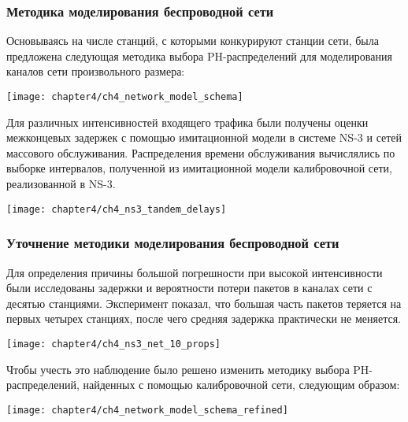 \begin{frame}
    \frametitle{Методика моделирования беспроводной сети}
    \footnotesize
    Основываясь на числе станций, с которыми конкурируют станции сети, была предложена следующая методика выбора PH-распределений для моделирования каналов сети произвольного размера:
    \begin{center}
        \texttt{[image: chapter4/ch4\_network\_model\_schema]}
    \end{center}

    \footnotesize
    Для различных интенсивностей входящего трафика были получены оценки межконцевых задержек с помощью имитационной модели в системе NS-3 и сетей массового обслуживания. Распределения времени обслуживания вычислялись по выборке интервалов, полученной из имитационной модели калибровочной сети, реализованной в NS-3.
    \begin{center}
        \texttt{[image: chapter4/ch4\_ns3\_tandem\_delays]}
    \end{center}
\end{frame}


\begin{frame}
    \frametitle{Уточнение методики моделирования беспроводной сети}
    \footnotesize
    Для определения причины большой погрешности при высокой интенсивности были исследованы задержки и вероятности потери пакетов в каналах сети с десятью станциями. Эксперимент показал, что большая часть пакетов теряется на первых четырех станциях, после чего средняя задержка практически не меняется.
    \begin{center}
        \texttt{[image: chapter4/ch4\_ns3\_net\_10\_props]}
    \end{center}

    \footnotesize
    Чтобы учесть это наблюдение было решено изменить методику выбора PH-распределений, найденных с помощью калибровочной сети, следующим образом:
    \begin{center}
        \texttt{[image: chapter4/ch4\_network\_model\_schema\_refined]}
    \end{center}
\end{frame}

